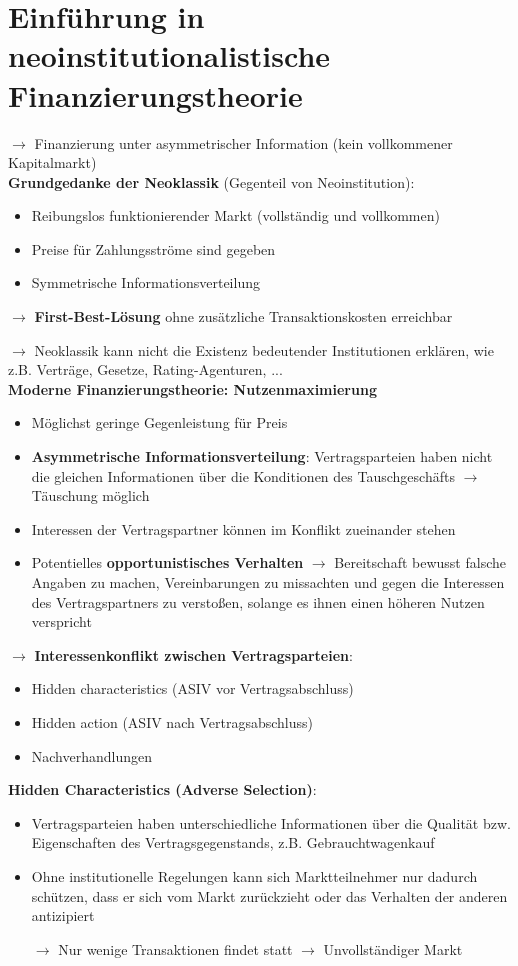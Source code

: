 \section{Einführung in neoinstitutionalistische Finanzierungstheorie}

$\rightarrow$ Finanzierung unter asymmetrischer Information (kein vollkommener Kapitalmarkt)\\

\textbf{Grundgedanke der Neoklassik} (Gegenteil von Neoinstitution):
\begin{itemize}
	\item Reibungslos funktionierender Markt (vollständig und vollkommen)
	\item Preise für Zahlungsströme sind gegeben
	\item Symmetrische Informationsverteilung
\end{itemize}
$\rightarrow$ \textbf{First-Best-Lösung} ohne zusätzliche Transaktionskosten erreichbar

$\rightarrow$ Neoklassik kann nicht die Existenz bedeutender Institutionen erklären, wie z.B. Verträge, Gesetze, Rating-Agenturen, ...\\

\textbf{Moderne Finanzierungstheorie: Nutzenmaximierung}
\begin{itemize}
	\item Möglichst geringe Gegenleistung für Preis
	\item \textbf{Asymmetrische Informationsverteilung}: Vertragsparteien haben nicht die gleichen Informationen über die Konditionen des Tauschgeschäfts $\rightarrow$ Täuschung möglich
	\item Interessen der Vertragspartner können im Konflikt zueinander stehen
	\item Potentielles \textbf{opportunistisches Verhalten} $\rightarrow$ Bereitschaft bewusst falsche Angaben zu machen, Vereinbarungen zu missachten und gegen die Interessen des Vertragspartners zu verstoßen, solange es ihnen einen höheren Nutzen verspricht
\end{itemize}
$\rightarrow$ \textbf{Interessenkonflikt zwischen Vertragsparteien}:
\begin{itemize}
	\item Hidden characteristics (ASIV vor Vertragsabschluss)
	\item Hidden action (ASIV nach Vertragsabschluss)
	\item Nachverhandlungen
\end{itemize}
\bigskip
\textbf{Hidden Characteristics (Adverse Selection)}:
\begin{itemize}
	\item Vertragsparteien haben unterschiedliche Informationen über die Qualität bzw. Eigenschaften des Vertragsgegenstands, z.B. Gebrauchtwagenkauf
	\item Ohne institutionelle Regelungen kann sich Marktteilnehmer nur dadurch schützen, dass er sich vom Markt zurückzieht oder das Verhalten der anderen antizipiert 
	
	$\rightarrow$ Nur wenige Transaktionen findet statt $\rightarrow$ Unvollständiger Markt
\end{itemize}

